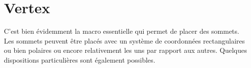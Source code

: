 
\section{Vertex}
C'est bien évidemment la macro essentielle qui permet de placer des sommets. Les sommets peuvent être placés avec un système de coordonnées rectangulaires ou bien polaires ou encore relativement les uns par rapport aux autres. Quelques dispositions particulières sont également possibles.

\subsection{}
